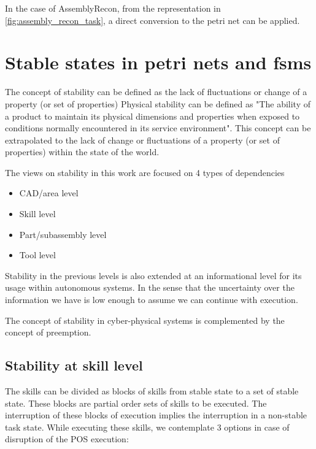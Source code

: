 \documentclass[a4paper,10pt]{article}
\begin{document}
In the case of AssemblyRecon, from the representation in \ref{fig:assembly_recon_task}, a direct conversion to the petri net can be applied. 


\section{Stable states in petri nets and fsms}

The concept of stability can be defined as the lack of fluctuations or change of a property (or set of properties) 
Physical stability can be defined as "The ability of a product to maintain its physical dimensions and properties when exposed to conditions normally encountered in its service environment". This concept can be extrapolated to the lack of change or fluctuations of a property (or set of properties) within the state of the world.

The views on stability in this work are focused on 4 types of dependencies
\begin{itemize}
	\item CAD/area level 
	\item Skill level 
	\item Part/subassembly level 
	\item Tool level 
\end{itemize}

Stability in the previous levels is also extended at an informational level for its usage within autonomous systems. In the sense that the uncertainty over the information we have is low enough to assume we can continue with execution.

The concept of stability in cyber-physical systems is complemented by the concept of preemption. 

\subsection{Stability at skill level}

The skills can be divided as blocks of skills from stable state to a set of stable state. These blocks are partial order sets of skills to be executed. The interruption of these blocks of execution implies the interruption in a non-stable task state. While executing these skills, we contemplate 3 options in case of disruption of the POS execution:
\end{document}
